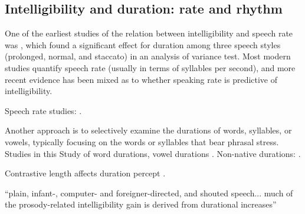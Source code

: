 

\subsection{Intelligibility and duration: rate and rhythm}
One of the earliest studies of the relation between intelligibility and speech rate was \citet{Tolhurst1957a}, which found a significant effect for duration among three speech styles (prolonged, normal, and staccato) in an analysis of variance test.  Most modern studies quantify speech rate (usually in terms of syllables per second), and more recent evidence has been mixed as to whether speaking rate is predictive of intelligibility.  

Speech rate studies: \citep{SommersEtAl1994, BradlowEtAl1996, KrauseBraida2002}.

Another approach is to selectively examine the durations of words, syllables, or vowels, typically focusing on the words or syllables that bear phrasal stress.  Studies in this  
Study of word durations, vowel durations \citep{BondMoore1994}.  
Non-native durations: \citep{QueneVanDelft2010}.  

Contrastive length affects duration percept \citep{DellwoHagmann2011}.  

“plain, infant-, computer- and foreigner-directed, and shouted speech... much of the prosody-related intelligibility gain is derived from durational increases” \citep{MayoEtAl2012}

